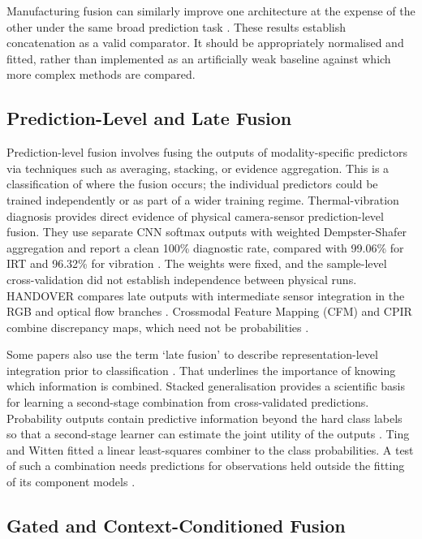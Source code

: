 Manufacturing fusion can similarly improve one architecture at the expense of the other under the
same broad prediction task \parencite[Table~3]{Li2022A}.
These results establish concatenation as a valid comparator. It should be appropriately normalised
and fitted, rather than implemented as an artificially weak baseline against which more complex
methods are compared.

\subsection{Prediction-Level and Late Fusion}

Prediction-level fusion involves fusing the outputs of modality-specific predictors via techniques
such as averaging, stacking, or evidence aggregation. This is a classification of where the fusion
occurs; the individual predictors could be trained independently or as part of a wider training
regime.
Thermal-vibration diagnosis provides direct evidence of physical camera-sensor prediction-level
fusion. They use separate CNN softmax outputs with weighted Dempster-Shafer aggregation and report a
clean 100\% diagnostic rate, compared with 99.06\% for IRT and 96.32\% for vibration \parencite[Table~VII]{Huo2022Multisensor}.
The weights were fixed, and the sample-level cross-validation did not establish independence between
physical runs.
HANDOVER compares late outputs with intermediate sensor integration in the RGB and optical flow
branches \parencite[Section~IV.A, Figure~3 and Table~III]{Thoduka2024Handover}.
Crossmodal Feature Mapping (CFM) and CPIR combine discrepancy maps, which need not be probabilities
\parencite{Costanzino2024Multimodal,Shangguan2025CPIR}.

Some papers also use the term `late fusion' to describe representation-level integration prior to
classification \parencite{Wang2020What}. That underlines the importance of knowing
which information is combined.
Stacked generalisation provides a scientific basis for learning a second-stage combination from
cross-validated predictions. Probability outputs contain predictive information beyond the hard
class labels so that a second-stage learner can estimate the joint utility of the outputs
\parencite[Sections~2--3]{Ting1999Issues}.
Ting and Witten fitted a linear least-squares combiner to the class probabilities. A test of such a combination needs predictions for observations held outside the fitting of its component models \parencite[Sections~2--3]{Ting1999Issues}.

\subsection{Gated and Context-Conditioned Fusion}

